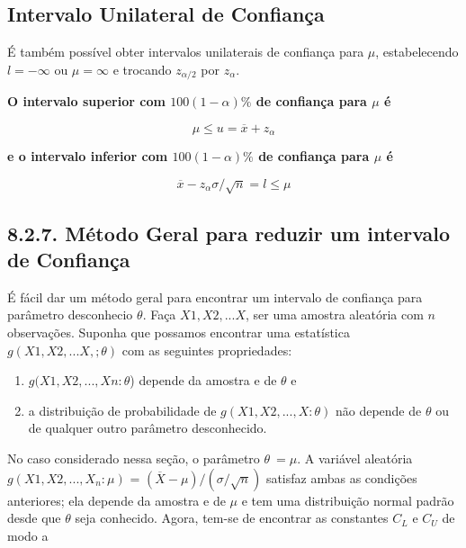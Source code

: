 \documentclass[a4paper,12pt]{article} %
\begin{document}
	\newpage 
	\subsection*{Intervalo Unilateral de Confiança}
	É também possível obter intervalos unilaterais de confiança para $\mu$, estabelecendo $l=-\infty$ ou $\mu=\infty$ e trocando $z_{\alpha/2}$ por $z_{\alpha}$.
	
	
	\vspace{0,2cm}
	\begin{blockquote}
		\begin{center} 
			\textbf{O intervalo superior com $100(1-\alpha)\%$ de confiança para $ \mu $ é} 
		\end{center}
		
		
		\begin{equation*}
			\mu \leq  u = \overline{x} + z_{\alpha} 
		\end{equation*}
		\begin{center} \textbf{e o intervalo inferior com $100(1-\alpha)\%$ de confiança para $ \mu $ é}
		\end{center}
		\begin{equation*}
			\overline{x} -z_{\alpha}{\sigma} /\sqrt{n} =  l \leq \mu
		\end{equation*}
	\end{blockquote}
	\vspace{0,4cm}
	
	\subsection*{8.2.7. Método Geral para reduzir um intervalo de Confiança}
	
	É fácil dar um método geral para encontrar um intervalo de confiança para parâmetro desconhecio $\theta$. Faça $X1, X2,...X$, ser uma amostra aleatória com $n$ observações. Suponha que possamos encontrar uma estatística $g(X1, X2,...X,;\theta)$ com as seguintes propriedades:
	\begin{enumerate}
		\item $g(X1, X2, ..., Xn:\theta$) depende da amostra e de $\theta$ e
		\item{a distribuição de probabilidade de $g(X1, X2, ..., X: \theta)$ não depende de $\theta$ ou de qualquer outro parâmetro desconhecido.}
	\end{enumerate}
	
	
	No caso considerado nessa seção, o parâmetro $\theta \ = \mu$. A variável aleatória $g(X1, X2, ..., X_n:\mu)$ = $(\overline{X}-\mu)/({\sigma} /\sqrt{n})$ satisfaz ambas as condições anteriores; ela depende da amostra e de $\mu$ e tem uma distribuição normal padrão desde que $\theta$ seja conhecido. Agora, tem-se de encontrar as constantes $C_L$ e $C_U$ de modo a 
	
\end{document}
